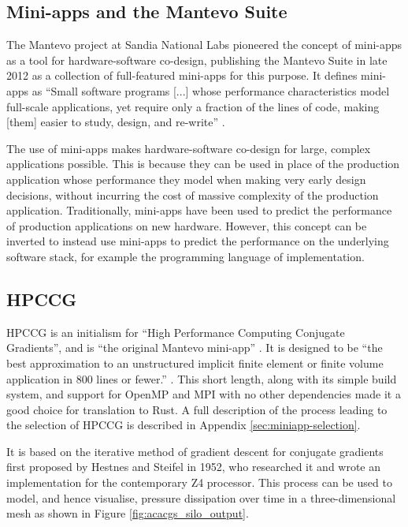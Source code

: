 \subsection{Mini-apps and the Mantevo Suite}
\label{ssec:miniapps-mantevo}

The Mantevo project at Sandia National Labs pioneered the concept of \acrshort{mini-app}s as a tool for hardware-software co-design, publishing the Mantevo Suite in late 2012 as a collection of full-featured \acrshort{mini-app}s for this purpose. It defines \acrshort{mini-app}s as ``Small software programs [...] whose performance characteristics model full-scale applications, yet require only a fraction of the lines of code, making [them] easier to study, design, and re-write'' \cite{heroux2013mantevo}.

The use of \acrshort{mini-app}s makes hardware-software co-design for large, complex applications possible. This is because they can be used in place of the production application whose performance they model when making very early design decisions, without incurring the cost of massive complexity of the production application. Traditionally, \acrshort{mini-app}s have been used to predict the performance of production applications on new hardware. However, this concept can be inverted to instead use \acrshort{mini-app}s to predict the performance on the underlying software stack, for example the programming language of implementation.

\subsection{HPCCG}
\label{ssec:hpccg}

HPCCG is an initialism for ``High Performance Computing Conjugate Gradients'', and is ``the original Mantevo mini-app'' \cite{herouxHPCCGSolverPackage2007}. It is designed to be ``the best approximation to an unstructured implicit finite element or finite volume application in 800 lines or fewer.'' \cite{PackagesMantevo}. This short length, along with its simple build system, and support for OpenMP and MPI with no other dependencies made it a good choice for translation to Rust. A full description of the process leading to the selection of HPCCG is described in Appendix \ref{sec:miniapp-selection}.

It is based on the iterative method of gradient descent for conjugate gradients first proposed by Hestnes and Steifel in 1952\cite{hestenesMethodsConjugateGradients1952}, who researched it and wrote an implementation for the contemporary Z4 processor. This process can be used to model, and hence visualise, pressure dissipation over time in a three-dimensional mesh as shown in Figure \ref{fig:acacgs_silo_output}.

